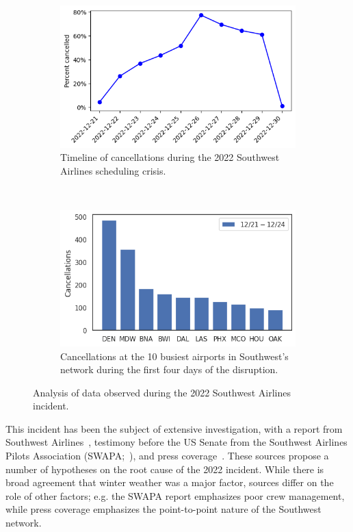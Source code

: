 \begin{figure}[tb]
    \centering
    \begin{subfigure}[t]{0.45\linewidth}
        \includegraphics[width=\linewidth]{images/icml/wn/wn_cancellations.png}
        \caption{Timeline of cancellations during the 2022 Southwest Airlines scheduling crisis.}
        \label{ch:icml:fig:wn_cancellations:timeline}
    \end{subfigure}\
    \begin{subfigure}[t]{0.45\linewidth}
        \includegraphics[width=\linewidth]{images/icml/wn/wn_cancellations_by_origin.png}
        \caption{Cancellations at the 10 busiest airports in Southwest's network during the first four days of the disruption.}
        \label{ch:icml:fig:wn_cancellations:cancellations}
    \end{subfigure}
    \caption{Analysis of data observed during the 2022 Southwest Airlines incident.}
\end{figure}

This incident has been the subject of extensive investigation, with a report from Southwest Airlines~\cite{southwestairlinesFinalSummaryAction2023}, testimony before the US Senate from the Southwest Airlines Pilots Association (SWAPA;~\cite{MurrayTestimony}), and press coverage~\cite{roseSouthwestWillPay2023,cramerWhatCausedChaos2022}. These sources propose a number of hypotheses on the root cause of the 2022 incident. While there is broad agreement that winter weather was a major factor, sources differ on the role of other factors; e.g. the SWAPA report emphasizes poor crew management, while press coverage emphasizes the point-to-point nature of the Southwest network.

